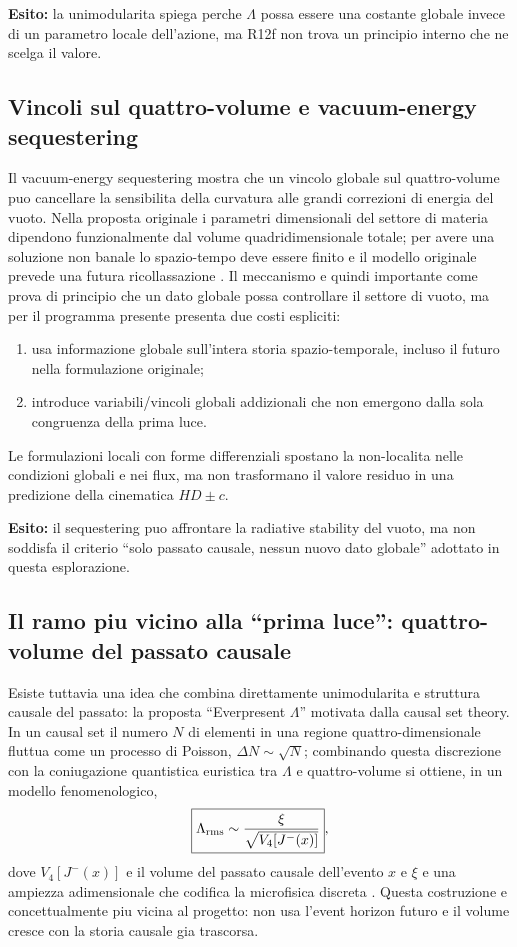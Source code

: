 \documentclass[11pt,a4paper]{article}
\begin{document}
\textbf{Esito:} la unimodularita spiega perche $\Lambda$ possa essere una costante globale invece di un parametro locale dell'azione, ma R12f non trova un principio interno che ne scelga il valore.

\subsection{Vincoli sul quattro-volume e vacuum-energy sequestering}

Il vacuum-energy sequestering mostra che un vincolo globale sul quattro-volume puo cancellare la sensibilita della curvatura alle grandi correzioni di energia del vuoto. Nella proposta originale i parametri dimensionali del settore di materia dipendono funzionalmente dal volume quadridimensionale totale; per avere una soluzione non banale lo spazio-tempo deve essere finito e il modello originale prevede una futura ricollassazione \cite{KaloperPadilla2014}. Il meccanismo e quindi importante come prova di principio che un dato globale possa controllare il settore di vuoto, ma per il programma presente presenta due costi espliciti:
\begin{enumerate}
\item usa informazione globale sull'intera storia spazio-temporale, incluso il futuro nella formulazione originale;
\item introduce variabili/vincoli globali addizionali che non emergono dalla sola congruenza della prima luce.
\end{enumerate}
Le formulazioni locali con forme differenziali spostano la non-localita nelle condizioni globali e nei flux, ma non trasformano il valore residuo in una predizione della cinematica $HD\pm c$.

\textbf{Esito:} il sequestering puo affrontare la radiative stability del vuoto, ma non soddisfa il criterio ``solo passato causale, nessun nuovo dato globale'' adottato in questa esplorazione.

\subsection{Il ramo piu vicino alla ``prima luce'': quattro-volume del passato causale}

Esiste tuttavia una idea che combina direttamente unimodularita e struttura causale del passato: la proposta ``Everpresent $\Lambda$'' motivata dalla causal set theory. In un causal set il numero $N$ di elementi in una regione quattro-dimensionale fluttua come un processo di Poisson, $\Delta N\sim\sqrt N$; combinando questa discrezione con la coniugazione quantistica euristica tra $\Lambda$ e quattro-volume si ottiene, in un modello fenomenologico,
\begin{equation}
 \boxed{\Lambda_{\rm rms}\sim\frac{\xi}{\sqrt{V_4[J^-(x)]}}},
 \label{eq:r12f_everpresent_scaling}
\end{equation}
dove $V_4[J^-(x)]$ e il volume del passato causale dell'evento $x$ e $\xi$ e una ampiezza adimensionale che codifica la microfisica discreta \cite{AhmedEtAl2004,AhmedSorkin2012}. Questa costruzione e concettualmente piu vicina al progetto: non usa l'event horizon futuro e il volume cresce con la storia causale gia trascorsa.
\end{document}
